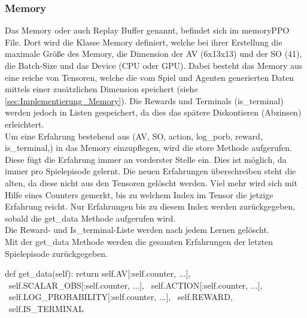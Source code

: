 \subsubsection{Memory}
Das Memory oder auch Replay Buffer genannt, befindet sich im memoryPPO File. Dort wird die Klasse Memory definiert, welche bei ihrer Erstellung die maximale Größe des Memory, die Dimension der AV (6x13x13) und der SO (41), die Batch-Size und das Device (CPU oder GPU).
Dabei besteht das Memory aus eine reiche von Tensoren, welche die vom Spiel und Agenten generierten Daten mittels einer zusätzlichen Dimension speichert (siehe \ref{sec:Implementierung_Memory}). Die Rewards und Terminals (is\_terminal) werden jedoch in Listen gespeichert, da dies das spätere Diskontieren (Abzinsen) erleichtert.\\
Um eine Erfahrung bestehend aus (AV, SO, action, log\_porb, reward, is\_terminal,) in das Memory einzupflegen, wird die store Methode aufgerufen. Diese fügt die Erfahrung immer an vorderster Stelle ein. Dies ist möglich, da immer pro Spielepisode gelernt. Die neuen Erfahrungen überschreiben steht die alten, da diese nicht aus den Tensoren gelöscht werden. Viel mehr wird sich mit Hilfe eines Counters gemerkt, bis zu welchem Index im Tensor die jetzige Erfahrung reicht. Nur Erfahrungen bis zu diesem Index werden zurückgegeben, sobald die get\_data Methode aufgerufen wird.\\
Die Reward- und Is\_terminal-Liste werden nach jedem Lernen gelöscht.
\\Mit der get\_data Methode werden die gesamten Erfahrungen der letzten Spielepisode zurückgegeben.
\begin{python}
	def get_data(self):
		return self.AV[:self.counter, ...], \
			     self.SCALAR_OBS[:self.counter, ...], \
			     self.ACTION[:self.counter, ...], \
			     self.LOG_PROBABILITY[:self.counter, ...], \
			     self.REWARD, \
			     self.IS_TERMINAL
\end{python}

